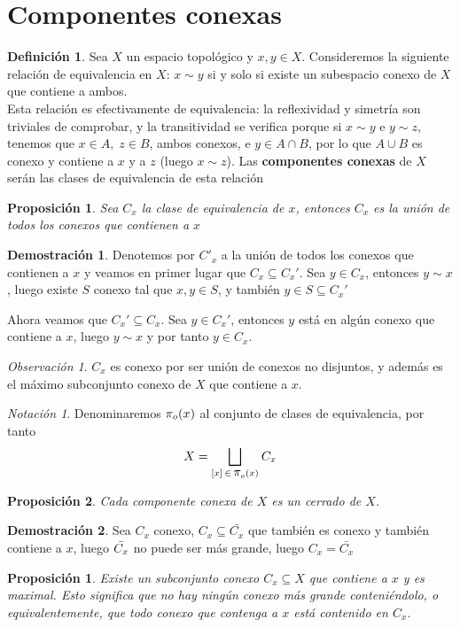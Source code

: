 \documentclass[12pt,twoside]{report}
\theoremstyle{azul}
\newtheorem*{propx}{Proposición}
\theoremstyle{azul2}
\theoremstyle{plain}
\newtheorem*{prop}{Proposición}
\theoremstyle{definition}
\newtheorem*{defi}{Definición}
\newtheorem*{dem}{Demostración}
\theoremstyle{remark}
\newtheorem*{obs}{Observación}
\newtheorem*{nota}{Notación}
\begin{document}
\section{Componentes conexas} \label{ccon}
\begin{defi}
Sea $X$ un espacio topológico y $x,y \in X$. Consideremos la siguiente relación de equivalencia en $X$: $x \sim y$ si y solo si existe un subespacio conexo de $X$ que contiene a ambos.\\
Esta relación es efectivamente de equivalencia: la reflexividad y simetría son triviales de comprobar, y la transitividad se verifica porque si $x \sim y$ e $y \sim z$, tenemos que $x \in A,\; z \in B$, ambos conexos, e $y \in A \cap B$, por lo que $A \cup B$ es conexo y contiene a $x$ y a $z$ (luego  $x \sim z$). 
Las \textbf{componentes conexas} de $X$ serán las clases de equivalencia de esta relación
\end{defi}
\begin{prop}
Sea $C_x$ la clase de equivalencia de $x$, entonces $C_x$ es la unión de todos los conexos que contienen a $x$
\end{prop}
\begin{dem}
Denotemos por $C'_x$ a la unión de todos los conexos que contienen a $x$ y veamos en primer lugar que $C_x \subseteq C_x'$. Sea $y \in C_x$, entonces $y \sim x$, luego existe $S$ conexo tal que $x,y \in S$, y también $y \in S \subseteq C_x'$

Ahora veamos que $C_x' \subseteq C_x$. Sea $y \in C_x'$, entonces $y$ está en algún conexo que contiene a $x$, luego $y \sim x$ y por tanto $y \in C_x$.
\end{dem}
\begin{obs}
 $C_x$ es conexo por ser unión de conexos no disjuntos, y además es el máximo subconjunto conexo de $X$ que contiene a $x$.
\end{obs}
\begin{nota}
Denominaremos $\mathlarger{\pi}_o(x)$ al conjunto de clases de equivalencia, por tanto
$$X=\underset{[x] \: \in \:  \mathlarger{\pi}_o(x)}{\bigsqcup} \: C_x$$
\end{nota}
\begin{prop}
Cada componente conexa de $X$ es un cerrado de $X$.
\end{prop}
\begin{dem}
Sea $C_x$ conexo, $C_x \subseteq \bar{C_x}$ que también es conexo y también contiene a $x$, luego $\Bar{C_x}$ no puede ser más grande, luego $C_x=\bar{C_x}$
\end{dem}
\begin{propx}
Existe un subconjunto conexo $C_x \subseteq X$ que contiene a $x$ y es maximal. Esto significa que no hay ning{\'u}n conexo más grande conteni{\'e}ndolo, o equivalentemente, que todo conexo que contenga a $x$ está contenido en $C_x$.
\end{propx}
\end{document}
